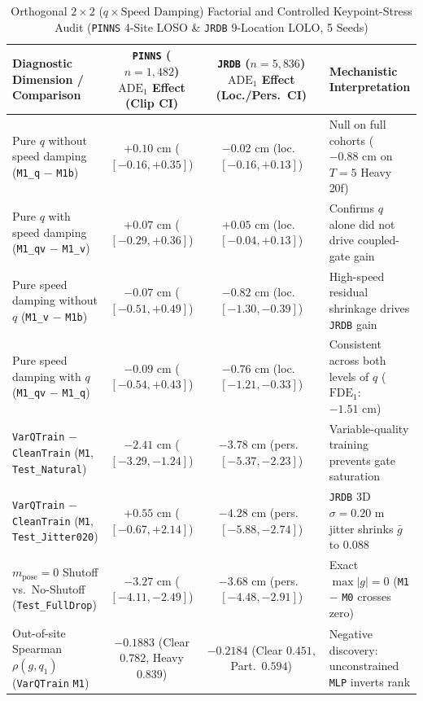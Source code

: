 \documentclass[journal]{IEEEtran}
\begin{document}
\begin{table}[!t]
\centering
\caption{Orthogonal $2\times 2$ ($q \times \text{Speed Damping}$) Factorial and Controlled Keypoint-Stress Audit (\texttt{PINNS} 4-Site LOSO \& \texttt{JRDB} 9-Location LOLO, 5 Seeds)}
\label{tab:factorial_gate}
\footnotesize
\begin{tabular}{lccl}
\toprule
Diagnostic Dimension / Comparison & \texttt{PINNS} ($n = 1{,}482$) $\text{ADE}_1$ Effect (Clip CI) & \texttt{JRDB} ($n = 5{,}836$) $\text{ADE}_1$ Effect (Loc./Pers.\ CI) & Mechanistic Interpretation \\
\midrule
Pure $q$ without speed damping (\texttt{M1\_q} $-$ \texttt{M1b}) & $+0.10\text{ cm}$ ($[-0.16, +0.35]$) & $-0.02\text{ cm}$ (loc.\ $[-0.16, +0.13]$) & Null on full cohorts ($-0.88\text{ cm}$ on $T=5$ Heavy 20f) \\
Pure $q$ with speed damping (\texttt{M1\_qv} $-$ \texttt{M1\_v}) & $+0.07\text{ cm}$ ($[-0.29, +0.36]$) & $+0.05\text{ cm}$ (loc.\ $[-0.04, +0.13]$) & Confirms $q$ alone did not drive coupled-gate gain \\
Pure speed damping without $q$ (\texttt{M1\_v} $-$ \texttt{M1b}) & $-0.07\text{ cm}$ ($[-0.51, +0.49]$) & \textbf{$-0.82\text{ cm}$} (loc.\ $[-1.30, -0.39]$) & High-speed residual shrinkage drives \texttt{JRDB} gain \\
Pure speed damping with $q$ (\texttt{M1\_qv} $-$ \texttt{M1\_q}) & $-0.09\text{ cm}$ ($[-0.54, +0.43]$) & \textbf{$-0.76\text{ cm}$} (loc.\ $[-1.21, -0.33]$) & Consistent across both levels of $q$ ($\text{FDE}_1$: $-1.51\text{ cm}$) \\
\texttt{VarQTrain} $-$ \texttt{CleanTrain} (\texttt{M1}, \texttt{Test\_Natural}) & \textbf{$-2.41\text{ cm}$} ($[-3.29, -1.24]$) & \textbf{$-3.78\text{ cm}$} (pers.\ $[-5.37, -2.23]$) & Variable-quality training prevents gate saturation \\
\texttt{VarQTrain} $-$ \texttt{CleanTrain} (\texttt{M1}, \texttt{Test\_Jitter020}) & $+0.55\text{ cm}$ ($[-0.67, +2.14]$) & \textbf{$-4.28\text{ cm}$} (pers.\ $[-5.88, -2.74]$) & \texttt{JRDB} 3D $\sigma=0.20\text{ m}$ jitter shrinks $\bar{g}$ to $0.088$ \\
$m_{\text{pose}}=0$ Shutoff vs.\ No-Shutoff (\texttt{Test\_FullDrop}) & \textbf{$-3.27\text{ cm}$} ($[-4.11, -2.49]$) & \textbf{$-3.68\text{ cm}$} (pers.\ $[-4.48, -2.91]$) & Exact $\max|g| = 0$ (\texttt{M1} $-$ \texttt{M0} crosses zero) \\
Out-of-site Spearman $\rho(g, q_1)$ (\texttt{VarQTrain} \texttt{M1}) & \textbf{$-0.1883$} (Clear $0.782$, Heavy $0.839$) & \textbf{$-0.2184$} (Clear $0.451$, Part.\ $0.594$) & Negative discovery: unconstrained \texttt{MLP} inverts rank \\

\end{tabular}
\end{table}
\end{document}

